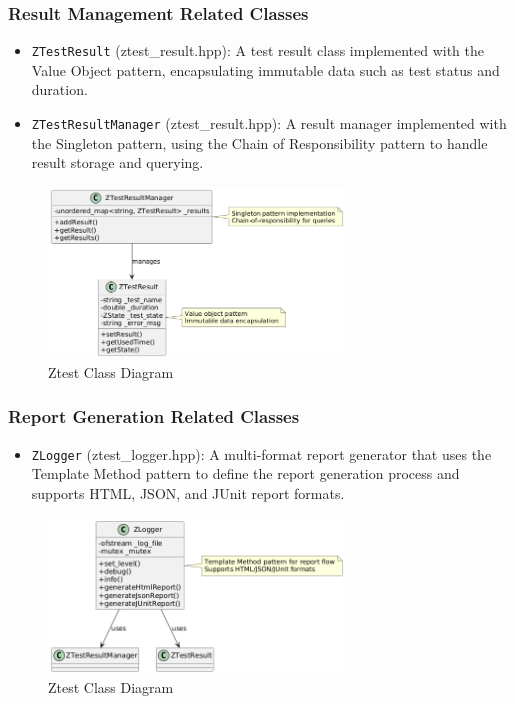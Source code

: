 \documentclass{article}
\begin{document}
\subsubsection{Result Management Related Classes}
\begin{itemize}
    \item \texttt{ZTestResult} (ztest\_result.hpp): A test result class implemented with the Value Object pattern, encapsulating immutable data such as test status and duration.
    \item \texttt{ZTestResultManager} (ztest\_result.hpp): A result manager implemented with the Singleton pattern, using the Chain of Responsibility pattern to handle result storage and querying.
\end{itemize}
\begin{figure}[H]
    \centering
    \includegraphics[width = 0.7\textwidth]{img/c5.png} %
    \caption{Ztest Class Diagram}
    \label{fig:ztest class }
\end{figure}
\subsubsection{Report Generation Related Classes}
\begin{itemize}
    \item \texttt{ZLogger} (ztest\_logger.hpp): A multi-format report generator that uses the Template Method pattern to define the report generation process and supports HTML, JSON, and JUnit report formats.
\end{itemize}
\begin{figure}[H]
    \centering
    \includegraphics[width =0.7\textwidth]{img/c6.png} %
    \caption{Ztest Class Diagram}
    \label{fig:ztest class }
\end{figure}
\end{document}
